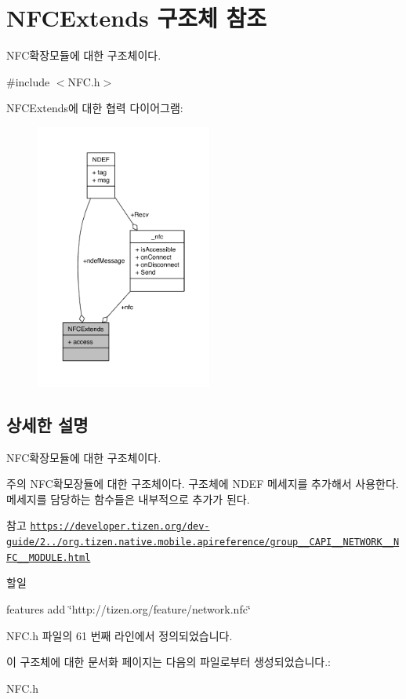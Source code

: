 \hypertarget{struct_n_f_c_extends}{\section{N\-F\-C\-Extends 구조체 참조}
\label{struct_n_f_c_extends}
}


N\-F\-C확장모듈에 대한 구조체이다.  




{\ttfamily \#include $<$N\-F\-C.\-h$>$}



N\-F\-C\-Extends에 대한 협력 다이어그램\-:\nopagebreak
\begin{figure}[H]
\begin{center}
\leavevmode
\includegraphics[width=164pt]{struct_n_f_c_extends__coll__graph}
\end{center}
\end{figure}


\subsection{상세한 설명}
N\-F\-C확장모듈에 대한 구조체이다. 

\begin{DoxyNote}{주의}
N\-F\-C확모장듈에 대한 구조체이다. 구조체에 N\-D\-E\-F 메세지를 추가해서 사용한다. 메세지를 담당하는 함수들은 내부적으로 추가가 된다. 
\end{DoxyNote}
\begin{DoxySeeAlso}{참고}
\href{https://developer.tizen.org/dev-guide/2.3.0/org.tizen.native.mobile.apireference/group__CAPI__NETWORK__NFC__MODULE.html}{\tt https\-://developer.\-tizen.\-org/dev-\/guide/2../org.\-tizen.\-native.\-mobile.\-apireference/group\-\_\-\-\_\-\-C\-A\-P\-I\-\_\-\-\_\-\-N\-E\-T\-W\-O\-R\-K\-\_\-\-\_\-\-N\-F\-C\-\_\-\-\_\-\-M\-O\-D\-U\-L\-E.\-html} 
\end{DoxySeeAlso}
\begin{DoxyRefDesc}{할일}
\item[\hyperlink{todo__todo000002}{할일}]features add \char`\"{}http\-://tizen.\-org/feature/network.\-nfc\char`\"{} \end{DoxyRefDesc}


N\-F\-C.\-h 파일의 61 번째 라인에서 정의되었습니다.



이 구조체에 대한 문서화 페이지는 다음의 파일로부터 생성되었습니다.\-:\begin{DoxyCompactItemize}
\item 
N\-F\-C.\-h\end{DoxyCompactItemize}
